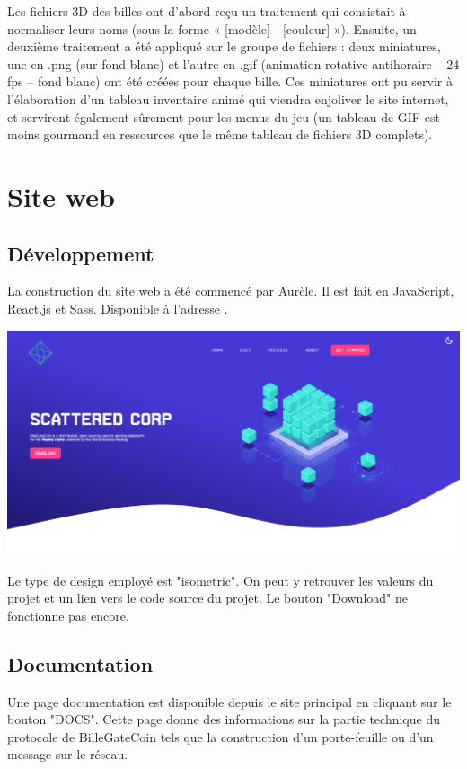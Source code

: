 \documentclass{article}
\begin{document}
Les fichiers 3D des billes ont d’abord reçu un traitement qui consistait à normaliser leurs noms (sous la forme « [modèle] - [couleur] »).
Ensuite, un deuxième traitement a été appliqué sur le groupe de fichiers : deux miniatures, une en .png (sur fond blanc) et l’autre en .gif (animation rotative antihoraire – 24 fps – fond blanc) ont été créées pour chaque bille.
Ces miniatures ont pu servir à l’élaboration d’un tableau inventaire animé qui viendra enjoliver le site internet, et serviront également sûrement pour les menus du jeu (un tableau de GIF est moins gourmand en ressources que le même tableau de fichiers 3D complets).


\section{Site web}
\subsection{Développement}
La construction du site web a été commencé par Aurèle. Il est fait en JavaScript, React.js et Sass.
Disponible à l'adresse .\\[1ex]
\begin{center}
\includegraphics[width=0.8\linewidth]{report/website.png}\\
\end{center}

Le type de design employé est "isometric". On peut y retrouver les valeurs du projet et un lien vers le code source du projet. Le bouton "Download" ne fonctionne pas encore.

\subsection{Documentation}
Une page documentation est disponible depuis le site principal en cliquant sur le bouton "DOCS". Cette page donne des informations sur la partie technique du protocole de BilleGateCoin tels que la construction d'un porte-feuille ou d'un message sur le réseau.
\end{document}
